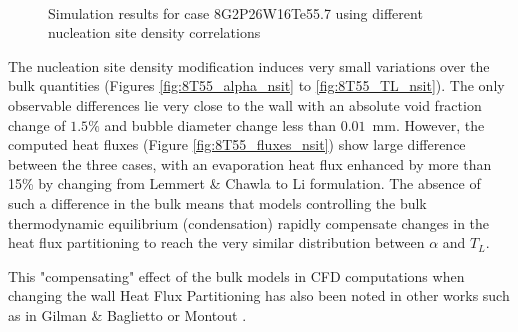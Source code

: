 \begin{figure}[!h]
{\label{fig:8T55_Tw_nsit}
}
\\
\caption{Simulation results for case 8G2P26W16Te55.7 using different nucleation site density correlations}
\label{fig:deb_cfd_8T55_nsit}
\end{figure}

\npar

The nucleation site density modification induces very small variations over the bulk quantities (Figures \ref{fig:8T55_alpha_nsit} to \ref{fig:8T55_TL_nsit}). The only observable differences lie very close to the wall with an absolute void fraction change of $1.5\%$ and bubble diameter change less than $0.01$\ mm. However, the computed heat fluxes (Figure \ref{fig:8T55_fluxes_nsit}) show large difference between the three cases, with an evaporation heat flux enhanced by more than 15\% by changing from Lemmert \& Chawla to Li \etal formulation. The absence of such a difference in the bulk means that models controlling the bulk thermodynamic equilibrium (\eg condensation) rapidly compensate changes in the heat flux partitioning to reach the very similar distribution between $\alpha$ and $T_{L}$.

\begin{note*}{}
This "compensating" effect of the bulk models in CFD computations when changing the wall Heat Flux Partitioning has also been noted in other works such as in Gilman \& Baglietto \cite{gilman_self-consistent_2017} or Montout \cite{montout_contribution_2009}.
\end{note*}



